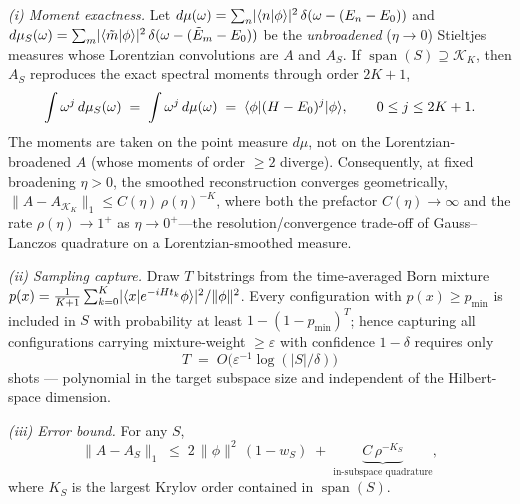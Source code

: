 \begin{theorem}
\label{thm:b2}
\emph{(i) Moment exactness.} Let
$d\mu(\omega)=\sum_n\lvert\langle n|\phi \rangle\rvert^{2}\,\delta(\omega-(E_n-E_0))$ and
$d\mu_S(\omega)=\sum_m\lvert\langle \tilde m|\phi \rangle\rvert^{2}\,\delta(\omega-(\tilde E_m-E_0))$ be the
\emph{unbroadened} ($\eta\to0$) Stieltjes measures whose Lorentzian convolutions are $A$ and $A_S$. If
$\operatorname{span}(S)\supseteq\mathcal{K}_K$, then $A_S$ reproduces the exact spectral moments through order $2K+1$,
\begin{equation}
\int \omega^{j}\,d\mu_S(\omega) \;=\; \int \omega^{j}\,d\mu(\omega) \;=\; \langle \phi|(H-E_0)^{j}|\phi \rangle,
\qquad 0\le j\le 2K+1.
\end{equation}
The moments are taken on the point measure $d\mu$, not on the Lorentzian-broadened $A$ (whose moments of
order $\ge2$ diverge). Consequently, at fixed broadening $\eta>0$, the smoothed reconstruction converges
geometrically, $\lVert A-A_{\mathcal{K}_K}\rVert_{1}\le C(\eta)\,\rho(\eta)^{-K}$, where both the
prefactor $C(\eta)\to\infty$ and the rate $\rho(\eta)\to1^{+}$ as $\eta\to0^{+}$---the
resolution/convergence trade-off of Gauss--Lanczos quadrature on a Lorentzian-smoothed measure.

\emph{(ii) Sampling capture.} Draw $T$ bitstrings from the time-averaged Born mixture
$p(x)=\tfrac{1}{K{+}1}\sum_{k=0}^{K}\lvert\langle x|e^{-iHt_k}\phi \rangle\rvert^{2}/\lVert\phi\rVert^{2}$.
Every configuration with $p(x)\ge p_{\min}$ is included in $S$ with probability at least
$1-(1-p_{\min})^{T}$; hence capturing all configurations carrying mixture-weight $\ge\varepsilon$
with confidence $1-\delta$ requires only
\begin{equation}
T \;=\; O\!\big(\varepsilon^{-1}\log(|S|/\delta)\big)
\end{equation}
shots --- polynomial in the target subspace size and independent of the Hilbert-space dimension.

\emph{(iii) Error bound.} For any $S$,
\begin{equation}
\lVert A-A_S\rVert_{1}\;\le\;2\,\lVert\phi\rVert^{2}\,(1-w_S)\;+\;\underbrace{C\,\rho^{-K_S}}_{\text{in-subspace quadrature}},
\end{equation}
where $K_S$ is the largest Krylov order contained in $\operatorname{span}(S)$.
\end{theorem}

